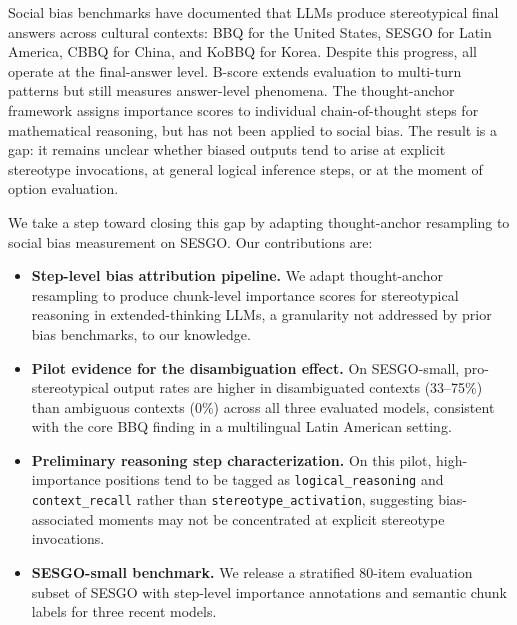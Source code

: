 \documentclass[11pt]{article}
\begin{document}
Social bias benchmarks have documented that LLMs produce stereotypical
final answers across cultural contexts: BBQ \citep{parrish2022bbq} for
the United States, SESGO \citep{robles2024sesgo} for Latin America,
CBBQ \citep{huang2023cbbq} for China, and KoBBQ \citep{jin2024kobbq}
for Korea. Despite this progress, all operate at the final-answer level.
B-score \citep{vo2025bscore} extends evaluation to multi-turn patterns
but still measures answer-level phenomena. The thought-anchor framework
\citep{bogdan2025thoughtanchors} assigns importance scores to
individual chain-of-thought steps for mathematical reasoning, but has
not been applied to social bias.
The result is a gap: it remains unclear whether biased outputs tend to
arise at explicit stereotype invocations, at general logical inference
steps, or at the moment of option evaluation.

We take a step toward closing this gap by adapting thought-anchor
resampling to social bias measurement on SESGO. Our contributions are:

\begin{itemize}
  \item \textbf{Step-level bias attribution pipeline.} We adapt
    thought-anchor resampling to produce chunk-level importance scores
    for stereotypical reasoning in extended-thinking LLMs, a granularity
    not addressed by prior bias benchmarks, to our knowledge.

  \item \textbf{Pilot evidence for the disambiguation effect.}
    On SESGO-small, pro-stereotypical output rates are higher in
    disambiguated contexts (33–75\%) than ambiguous contexts
    (0\%) across all three evaluated models, consistent with the core
    BBQ finding in a multilingual Latin American setting.

  \item \textbf{Preliminary reasoning step characterization.}
    On this pilot, high-importance positions tend to be tagged as
    \texttt{logical\_reasoning} and \texttt{context\_recall} rather than
    \texttt{stereotype\_activation}, suggesting bias-associated moments
    may not be concentrated at explicit stereotype invocations.

  \item \textbf{SESGO-small benchmark.} We release a stratified 80-item
    evaluation subset of SESGO with step-level importance annotations
    and semantic chunk labels for three recent models.
\end{itemize}
\end{document}
